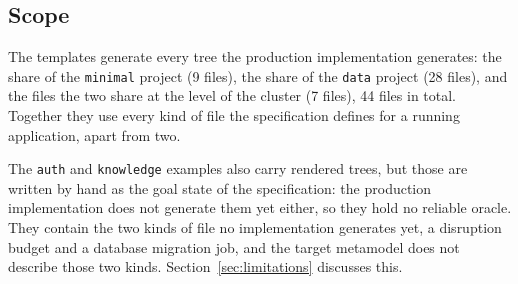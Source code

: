 \subsection{Scope}
\label{sec:scope}

The templates generate every tree the production implementation generates:
the share of the \texttt{minimal} project (9 files), the share of the
\texttt{data} project (28 files), and the files the two share at the level of
the cluster (7 files), 44 files in total. Together they use every kind of file
the specification defines for a running application, apart from two.

The \texttt{auth} and \texttt{knowledge} examples also carry rendered trees, but
those are written by hand as the goal state of the specification: the
production implementation does not generate them yet either, so they hold no
reliable oracle. They contain the two kinds of file no implementation generates
yet, a disruption budget and a database migration job, and the target
metamodel does not describe those two kinds. Section~\ref{sec:limitations}
discusses this.
